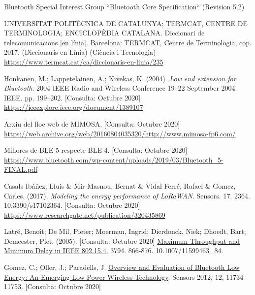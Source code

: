\begin{thebibliography}{2}

Bluetooth Special Interest Group
``Bluetooth Core Specification``
(Revision 5.2)

UNIVERSITAT POLITÈCNICA DE CATALUNYA; TERMCAT, CENTRE DE TERMINOLOGIA; ENCICLOPÈDIA CATALANA. Diccionari de telecomunicacions [en línia]. Barcelona: TERMCAT, Centre de Terminologia, cop. 2017. (Diccionaris en Línia) (Ciència i Tecnologia)
\href{https://www.termcat.cat/ca/diccionaris-en-linia/235}{https://www.termcat.cat/ca/diccionaris-en-linia/235}

Honkanen, M.; Lappetelainen, A.; Kivekas, K. (2004). \textit{Low end extension for Bluetooth}. 2004 IEEE Radio and Wireless Conference 19–22 September 2004. IEEE. pp. 199–202.
[Consulta: Octubre 2020] \href{https://ieeexplore.ieee.org/document/1389107}{https://ieeexplore.ieee.org/document/1389107}

Arxiu del lloc web de MIMOSA. [Consulta: Octubre 2020]\newline
\href{https://web.archive.org/web/20160804035320/http://www.mimosa-fp6.com/}{https://web.archive.org/web/20160804035320/http://www.mimosa-fp6.com/}


Millores de BLE 5 respecte BLE 4. [Consulta: Octubre 2020]\newline
\href{https://www.bluetooth.com/wp-content/uploads/2019/03/Bluetooth\_5-FINAL.pdf}{https://www.bluetooth.com/wp-content/uploads/2019/03/Bluetooth\_5-FINAL.pdf}

Casals Ibáñez, Lluis \& Mir Masnou, Bernat \& Vidal Ferré, Rafael \& Gomez, Carles. (2017). \textit{Modeling the energy performance of LoRaWAN}. Sensors. 17. 2364. 10.3390/s17102364. 
[Consulta: Octubre 2020] \newline
\href{https://www.researchgate.net/publication/320435869}{https://www.researchgate.net/publication/320435869}

Latré, Benoît; De Mil, Pieter; Moerman, Ingrid; Dierdonck, Niek; Dhoedt, Bart; Demeester, Piet. (2005).
[Consulta: Octubre 2020] \href{https://www.researchgate.net/publication/220963645_Maximum_Throughput_and_Minimum_Delay_in_IEEE_802154}{Maximum Throughput and Minimum Delay in IEEE 802.15.4.} 3794. 866-876. 10.1007/11599463\_84.

Gomez, C.; Oller, J.; Paradells, J.  \href{https://www.mdpi.com/1424-8220/12/9/11734}{Overview and Evaluation of Bluetooth Low Energy: An Emerging Low-Power Wireless Technology}. Sensors 2012, 12, 11734-11753.
[Consulta: Octubre 2020]


\end{thebibliography}
